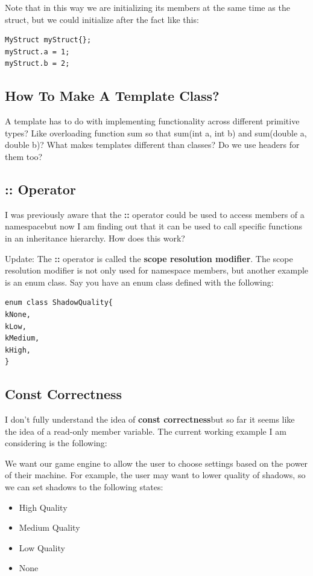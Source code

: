 \documentclass{article}
\begin{document}
\par Note that in this way we are initializing its members at the
same time as the struct, but we could initialize after the fact like this:
\begin{verbatim}
MyStruct myStruct{};
myStruct.a = 1;
myStruct.b = 2;
\end{verbatim}

\subsection*{How To Make A Template Class?}
\par A template has to do with implementing functionality across
different primitive types? Like overloading function sum so that
sum(int a, int b) and sum(double a, double b)? What makes templates
different than classes? Do we use headers for them too?

\subsection*{:: Operator}
\par I was previously aware that the \textbf{::} operator could be
used to access members of a namespace\textemdash but now I am finding
out that it can be used to call specific functions in an inheritance
hierarchy. How does this work?

\par Update: The \textbf{::} operator is called the \textbf{scope
resolution modifier}. The scope resolution modifier is not only used
for namespace members, but another example is an enum class. Say you
have an enum class defined with the following:
\begin{verbatim}
enum class ShadowQuality{
kNone,
kLow,
kMedium,
kHigh,
}
\end{verbatim}

\subsection*{Const Correctness}
\par I don't fully understand the idea of \textbf{const
correctness}\textemdash but so far it seems like the idea of a
read-only member variable. The current working example I am
considering is the following:

\par We want our game engine to allow the user to choose settings
based on the power of their machine. For example, the user may want
to lower quality of shadows, so we can set shadows to the following states:
\begin{itemize}
  \item High Quality
  \item Medium Quality
  \item Low Quality
  \item None
\end{itemize}
\end{document}
